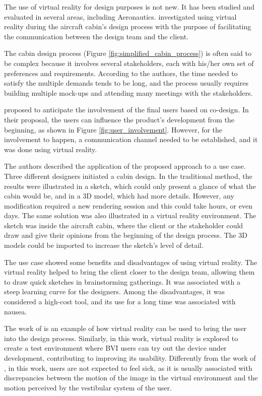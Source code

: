 
The use of virtual reality for design purposes is not new. It has been studied and evaluated in several areas, including Aeronautics.  investigated using virtual reality during the aircraft cabin’s design process with the purpose of facilitating the communication between the design team and the client. 

The cabin design process (Figure \ref{fig:simplified_cabin_process}) is often said to be complex because it involves several stakeholders, each with his/her own set of preferences and requirements. According to the authors, the time needed to satisfy the multiple demands tends to be long, and the process usually requires building multiple mock-ups and attending many meetings with the stakeholders. 



 proposed to anticipate the involvement of the final users based on co-design. In their proposal, the users can influence the product’s development from the beginning, as shown in Figure \ref{fig:user_involvement}. However, for the involvement to happen, a communication channel needed to be established, and it was done using virtual reality.



The authors described the application of the proposed approach to a use case. Three different designers initiated a cabin design. In the traditional method, the results were illustrated in a sketch, which could only present a glance of what the cabin would be, and in a 3D model, which had more details. However, any modification required a new rendering session and this could take hours, or even days. The same solution was also illustrated in a virtual reality environment. The sketch was inside the aircraft cabin, where the client or the stakeholder could draw and give their opinions from the beginning of the design process. The 3D models could be imported to increase the sketch’s level of detail.

The use case showed some benefits and disadvantages of using virtual reality. The virtual reality helped to bring the client closer to the design team, allowing them to draw quick sketches in brainstorming gatherings. It was associated with a steep learning curve for the designers. Among the disadvantages, it was considered a high-cost tool, and its use for a long time was associated with nausea. 

The work of  is an example of how virtual reality can be used to bring the user into the design process. Similarly, in this work, virtual reality is explored to create a test environment where BVI users can try out the device under development, contributing to improving its usability. Differently from the work of , in this work, users are not expected to feel sick, as it is usually associated with discrepancies between the motion of the image in the virtual environment and the motion perceived by the vestibular system of the user.